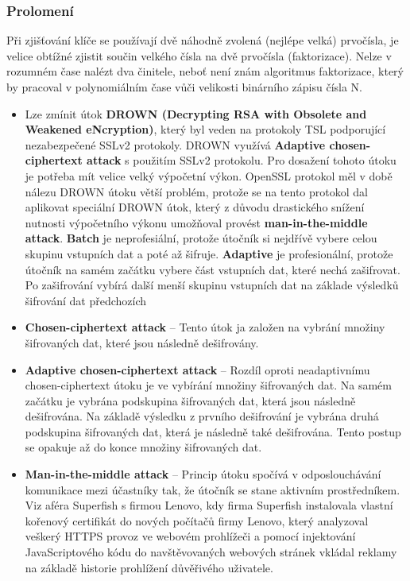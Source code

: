 \documentclass[12pt, a4paper]{article}
\begin{document}
		\subsubsection{Prolomení}
		Při zjišťování klíče se používají dvě náhodně zvolená (nejlépe velká) prvočísla, je velice obtížné zjistit součin velkého čísla na dvě prvočísla (faktorizace). Nelze v rozumném čase nalézt dva činitele, neboť není znám algoritmus faktorizace, který by pracoval v polynomiálním čase vůči velikosti binárního zápisu čísla N.
		\par
			\begin{itemize}
		\item Lze zmínit útok \textbf{DROWN (Decrypting RSA with Obsolete and Weakened eNcryption)}, který byl veden na protokoly TSL podporující nezabezpečené SSLv2 protokoly. DROWN využívá \textbf{Adaptive chosen-ciphertext attack} s použitím SSLv2 protokolu. Pro dosažení tohoto útoku je potřeba mít velice velký výpočetní výkon. OpenSSL protokol měl v době nálezu DROWN útoku větší problém, protože se na tento protokol dal aplikovat speciální DROWN útok, který z důvodu drastického snížení nutnosti výpočetního výkonu umožňoval provést \textbf{man-in-the-middle attack}.
\textbf{Batch} je neprofesiální, protože útočník si nejdřívě vybere celou skupinu vstupních dat a poté až šifruje. \textbf{Adaptive} je profesionální, protože útočník na samém začátku vybere část vstupních dat, které nechá zašifrovat. Po zašifrování vybírá další menší skupinu vstupních dat na základe výsledků šifrování dat předchozích
			 \item \textbf{Chosen-ciphertext attack} -- Tento útok ja založen na vybrání množiny šifrovaných dat, které jsou následně dešifrovány.
			 \item \textbf{Adaptive chosen-ciphertext attack} -- Rozdíl oproti neadaptivnímu chosen-ciphertext útoku je ve vybírání množiny šifrovaných dat. Na samém začátku je vybrána podskupina šifrovaných dat, která jsou následně dešifrována. Na základě výsledku z prvního dešifrování je vybrána druhá podskupina šifrovaných dat, která je následně také dešifrována. Tento postup se opakuje až do konce množiny šifrovaných dat.
			 \item \textbf{Man-in-the-middle attack} -- Princip útoku spočívá v odposlouchávání komunikace mezi účastníky tak, že útočník se stane aktivním prostředníkem. Viz aféra Superfish s firmou Lenovo, kdy firma Superfish instalovala vlastní kořenový certifikát do nových počítačů firmy Lenovo, který analyzoval veškerý HTTPS provoz ve webovém prohlížeči a pomocí injektování JavaScriptového kódu do navštěvovaných webových stránek vkládal reklamy na základě historie prohlížení důvěřivého uživatele.
			\end{itemize}
\end{document}
